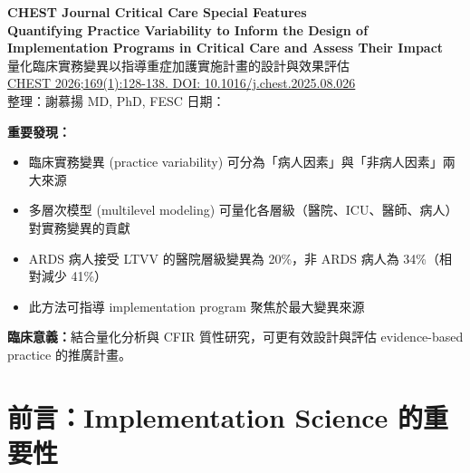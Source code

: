 \documentclass[12pt,a4paper]{article}
\begin{document}

\begin{center}
{\LARGE\bfseries\textcolor{emergency_red}{CHEST Journal Critical Care Special Features}}\\[0.5cm]
{\Large\textbf{Quantifying Practice Variability to Inform the Design of Implementation Programs in Critical Care and Assess Their Impact}}\\[0.3cm]
{\large 量化臨床實務變異以指導重症加護實施計畫的設計與效果評估}\\[0.5cm]
{\normalsize \href{https://doi.org/10.1016/j.chest.2025.08.026}{CHEST 2026;169(1):128-138. DOI: 10.1016/j.chest.2025.08.026}}\\[0.3cm]
{\normalsize 整理：謝慕揚 MD, PhD, FESC \quad 日期：\mydate}
\end{center}

\vspace{0.5cm}


\begin{tcolorbox}[colback=yellow!10!white,colframe=orange!75!black,title=\textbf{核心發現摘要}]
\textbf{重要發現：}
\begin{itemize}[nosep]
    \item 臨床實務變異 (practice variability) 可分為「病人因素」與「非病人因素」兩大來源
    \item 多層次模型 (multilevel modeling) 可量化各層級（醫院、ICU、醫師、病人）對實務變異的貢獻
    \item ARDS 病人接受 LTVV 的醫院層級變異為 20\%，非 ARDS 病人為 34\%（相對減少 41\%）
    \item 此方法可指導 implementation program 聚焦於最大變異來源
\end{itemize}

\textbf{臨床意義：}結合量化分析與 CFIR 質性研究，可更有效設計與評估 evidence-based practice 的推廣計畫。
\end{tcolorbox}

\tableofcontents
\newpage

\section{前言：Implementation Science 的重要性}
\end{document}

